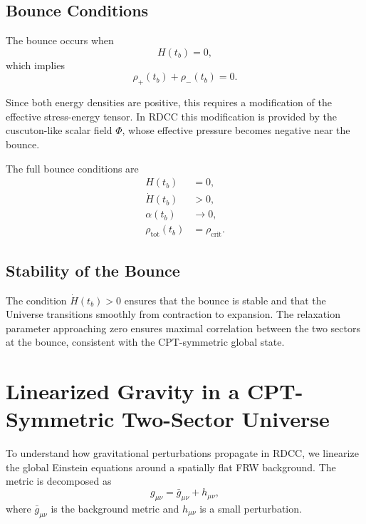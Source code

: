 \documentclass[11pt,a4paper]{article}
\begin{document}
\subsection{Bounce Conditions}

The bounce occurs when
\begin{equation}
H(t_b) = 0,
\end{equation}
which implies
\begin{equation}
\rho_+(t_b) + \rho_-(t_b) = 0.
\end{equation}

Since both energy densities are positive, this requires a modification of the effective stress-energy tensor. In RDCC this modification is provided by the cuscuton-like scalar field $\Phi$, whose effective pressure becomes negative near the bounce.

The full bounce conditions are
\begin{align}
H(t_b) &= 0, \\
\dot{H}(t_b) &> 0, \\
\alpha(t_b) &\to 0, \\
\rho_{\mathrm{tot}}(t_b) &= \rho_{\mathrm{crit}}.
\end{align}

\subsection{Stability of the Bounce}

The condition $\dot{H}(t_b) > 0$ ensures that the bounce is stable and that the Universe transitions smoothly from contraction to expansion. The relaxation parameter approaching zero ensures maximal correlation between the two sectors at the bounce, consistent with the CPT-symmetric global state.
\section{Linearized Gravity in a CPT-Symmetric Two-Sector Universe}

To understand how gravitational perturbations propagate in RDCC, we linearize the global Einstein equations around a spatially flat FRW background. The metric is decomposed as
\begin{equation}
g_{\mu\nu} = \bar{g}_{\mu\nu} + h_{\mu\nu},
\end{equation}
where $\bar{g}_{\mu\nu}$ is the background metric and $h_{\mu\nu}$ is a small perturbation.
\end{document}

